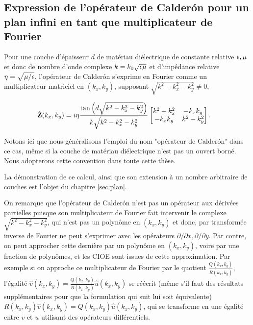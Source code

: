   \subsection{Expression de l'opérateur de Calderón pour un plan infini en tant que multiplicateur de Fourier}

    Pour une couche d'épaisseur \(d\) de matériau diélectrique de constante relative \(\epsilon,\mu\) et donc de nombre d'onde complexe \(k = k_0\sqrt{\epsilon\mu}\) et d'impédance relative \(\eta=\sqrt{{\mu}/{\epsilon}}\), l'opérateur de Calderón s'exprime en Fourier comme un multiplicateur matriciel en \((k_x,k_y)\), supposant \(\sqrt{k^2-k_x^2-k_y^2}\not=0\),

    \begin{align*}
      \hat {\mathbf{Z}}(k_x,k_y) &= i\eta\dfrac{\tan\left(d\sqrt{k^2-k_x^2-k_y^2}\right)}{k \sqrt{k^2-k_x^2-k_y^2}}
      \begin{bmatrix}
        k^2-k_x^2  & -k_xk_y
        \\
        -k_xk_y & k^2-k_y^2
      \end{bmatrix}.
    \end{align*}

    Notons ici que nous généralisons l'emploi du nom "opérateur de Calderón" dans ce cas, même si la couche de matériau diélectrique n'est pas un ouvert borné. Nous adopterons cette convention dans toute cette thèse. 
    
    La démonstration de ce calcul, ainsi que son extension à un nombre arbitraire de couches est l'objet du chapitre \ref{sec:plan}.

    On remarque que l'opérateur de Calderón n'est pas un opérateur aux dérivées partielles puisque son multiplicateur de Fourier fait intervenir le complexe \(\sqrt{k^2-k_x^2 - k_y^2}\), qui n'est pas un polynôme en $(k_x,k_y)$ et donc, par transformée inverse de Fourier ne peut s'exprimer avec les opérateurs \(\partial/\partial x, \partial / \partial y\).
    Par contre, on peut approcher cette dernière par un polynôme en \((k_x,k_y)\), voire par une fraction de polynômes, et les CIOE sont issues de cette approximation.
    Par exemple si on approche ce multiplicateur de Fourier par le quotient \(\frac{Q(k_x,k_y)}{R(k_x,k_y)}\), l'égalité \({\hat v}(k_x,k_y)=\frac{Q(k_x,k_y)}{R(k_x,k_y)}{\hat u}(k_x,k_y)\) se réécrit (même s'il faut des résultats supplémentaires pour que la formulation qui suit lui soit équivalente) \(R(k_x,k_y){\hat v}(k_x,k_y)=Q(k_x,k_y){\hat u}(k_x,k_y)\), qui se transforme en une égalité entre $v$ et $u$ utilisant des opérateurs différentiels.
    
